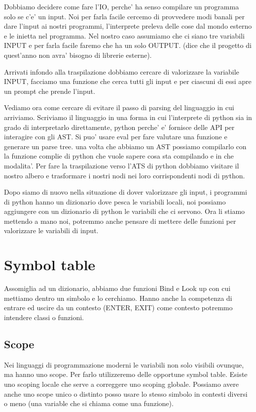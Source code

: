 Dobbiamo decidere come fare l'IO, perche' ha senso compilare un programma solo se c'e' un input. Noi per farla facile cercemo di provvedere modi banali per dare l'input ai nostri programmi, l'interprete preleva delle cose dal mondo esterno e le inietta nel programma. Nel nostro caso assumiamo che ci siano tre variabili INPUT e per farla facile faremo che ha un solo OUTPUT. (dice che il progetto di quest'anno non avra' bisogno di librerie esterne).


Arrivati infondo alla traspilazione dobbiamo cercare di valorizzare la variabile INPUT, facciamo una funzione che cerca tutti gli input e per ciascuni di essi apre un prompt che prende l'input.

Vediamo ora come cercare di evitare il passo di parsing del linguaggio in cui arriviamo. Scriviamo il linguaggio in una forma in cui l'interprete di python sia in grado di interpretarlo direttamente, python perche' e' fornisce delle API per interagire con gli AST.
Si puo' usare eval per fare valutare una funzione e generare un parse tree. una volta che abbiamo un AST possiamo compilarlo con la funzione complie di python che vuole sapere cosa sta compilando e in che modalita'.
Per fare la traspilazione verso l'ATS di python dobbiamo visitare il nostro albero e trasformare i nostri nodi nei loro corrispondenti nodi di python.

Dopo siamo di nuovo nella situazione di dover valorizzare gli input, i programmi di python hanno un dizionario dove pesca le variabili locali, noi possiamo aggiungere con un dizionario di python le variabili che ci servono. Ora li stiamo mettendo a mano noi, potremmo anche pensare di mettere delle funzioni per valorizzare le variabili di input.

\section{Symbol table}
Assomiglia ad un dizionario, abbiamo due funzioni Bind e Look up con cui mettiamo dentro un simbolo e lo cerchiamo. Hanno anche la competenza di entrare ed uscire da un contesto (ENTER, EXIT) come contesto potremmo intendere classi o funzioni.

\subsection{Scope}
Nei linguaggi di programmazione moderni le variabili non solo visibili ovunque, ma hanno uno scope. Per farlo utilizzeremo delle opportune symbol table. Esiste uno scoping locale che serve a correggere uno scoping globale. Possiamo avere anche uno scope unico o distinto posso usare lo stesso simbolo in contesti diversi o meno (una variable che si chiama come una funzione).

